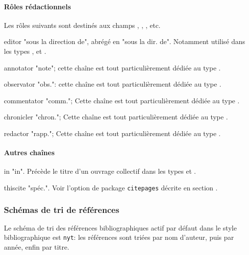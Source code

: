 \documentclass{ltxdockit}
\newcommand*{\bibstylename}{droit-fr\xspace}
\begin{document}
\paragraph{Rôles rédactionnels}
\label{stringsroles}

Les rôles suivants sont destinés aux champs , , , etc.
\begin{keymarglist}
\item[editor] "sous la direction de", abrégé en "sous la dir. de". Notamment utilisé dans les types ,  et .
\item[annotator] "note"; cette chaîne est tout particulièrement dédiée au type .
\item[observator] "obs.": cette chaîne est tout particulièrement dédiée au type .
\item[commentator] "comm."; Cette chaîne est tout particulièrement dédiée au type .
\item[chronicler] "chron."; Cette chaîne est tout particulièrement dédiée au type .
\item[redactor] "rapp."; Cette chaîne est tout particulièrement dédiée au type .
\end{keymarglist}

\paragraph{Autres chaînes}
\label{stringsother}

\begin{keymarglist}
\item[in] "in". Précède le titre d'un ouvrage collectif dans les types  et .
\item[thiscite] "spéc.". Voir l'option de package \texttt{citepages} décrite en section .
\end{keymarglist}

\subsubsection{Schémas de tri de références}
\label{tri}

Le schéma de tri des références bibliographiques actif par défaut dans le style bibliographique \sty{\bibstylename} est \texttt{nyt}: les références sont triées par nom d'auteur, puis par année, enfin par titre.
\end{document}
